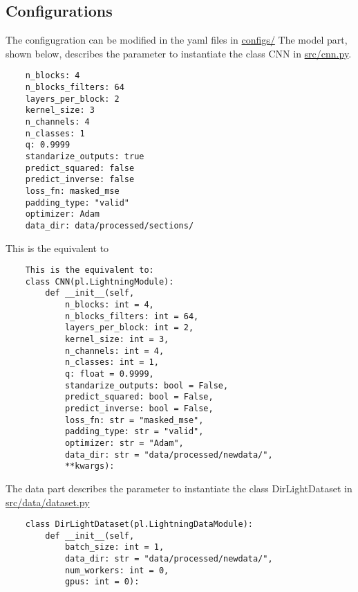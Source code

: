 \documentclass[11pt]{article}
\begin{document}
\subsection{Configurations}
\label{sec:orgdba2b69}
The configugration can be modified in the yaml files in \url{configs/}
The model part, shown below, describes the parameter to instantiate the class CNN in \url{src/cnn.py}.
\begin{verbatim}
    n_blocks: 4
    n_blocks_filters: 64
    layers_per_block: 2
    kernel_size: 3
    n_channels: 4
    n_classes: 1
    q: 0.9999
    standarize_outputs: true
    predict_squared: false
    predict_inverse: false
    loss_fn: masked_mse
    padding_type: "valid"
    optimizer: Adam
    data_dir: data/processed/sections/

\end{verbatim}
This is the equivalent to
\begin{verbatim}
    This is the equivalent to:
    class CNN(pl.LightningModule):
        def __init__(self,
            n_blocks: int = 4,
            n_blocks_filters: int = 64,
            layers_per_block: int = 2,
            kernel_size: int = 3,
            n_channels: int = 4,
            n_classes: int = 1,
            q: float = 0.9999,
            standarize_outputs: bool = False,
            predict_squared: bool = False,
            predict_inverse: bool = False,
            loss_fn: str = "masked_mse",
            padding_type: str = "valid",
            optimizer: str = "Adam",
            data_dir: str = "data/processed/newdata/",
            **kwargs):
\end{verbatim}

The data part describes the parameter to instantiate the class DirLightDataset in \url{src/data/dataset.py}

\begin{verbatim}
    class DirLightDataset(pl.LightningDataModule):
        def __init__(self,
            batch_size: int = 1,
            data_dir: str = "data/processed/newdata/",
            num_workers: int = 0,
            gpus: int = 0):
\end{verbatim}
\end{document}
